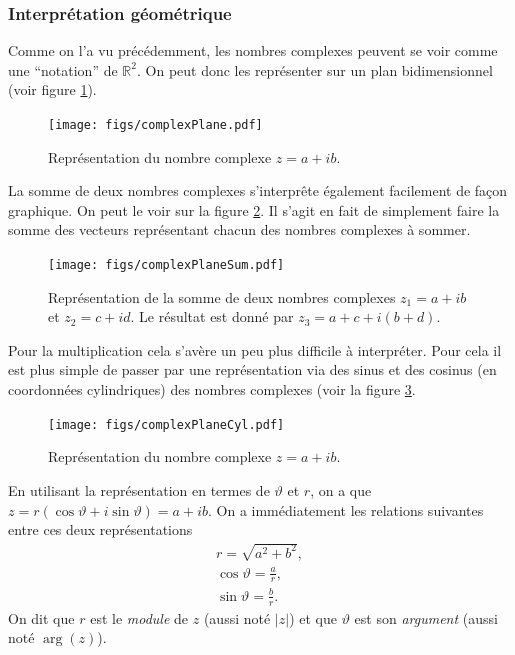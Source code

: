 \documentclass[a4paper,12pt]{book}
\newcommand{\real}{\mathbb{R}}
\begin{document}
\subsubsection{Interprétation géométrique}

Comme on l'a vu précédemment, les nombres complexes peuvent se voir comme une ``notation'' 
de $\real^2$. On peut donc les représenter sur un plan bidimensionnel (voir figure \ref{fig_complexPlane}).
\begin{figure}[htp]
\begin{center}
\texttt{[image: figs/complexPlane.pdf]}
\end{center}
\caption{Représentation du nombre complexe $z=a+ib$.}\label{fig_complexPlane}
\end{figure}
La somme de deux nombres complexes s'interprête également facilement
de façon graphique. On peut le voir sur la figure \ref{fig_complexPlaneSum}. Il s'agit en fait de simplement
faire la somme des vecteurs représentant chacun des nombres complexes à sommer.
\begin{figure}[htp]
\begin{center}
\texttt{[image: figs/complexPlaneSum.pdf]}
\end{center}
\caption{Représentation de la somme de deux nombres complexes $z_1=a+ib$ et $z_2=c+id$. Le résultat est donné par $z_3=a+c+i(b+d)$.}\label{fig_complexPlaneSum}
\end{figure}

Pour la multiplication cela s'avère un peu plus difficile à interpréter. Pour cela
il est plus simple de passer par une représentation via des sinus et des cosinus (en coordonnées cylindriques)
des nombres complexes (voir la figure \ref{fig_complexPlaneCyl}.
\begin{figure}[htp]
\begin{center}
\texttt{[image: figs/complexPlaneCyl.pdf]}
\end{center}
\caption{Représentation du nombre complexe $z=a+ib$.}\label{fig_complexPlaneCyl}
\end{figure}

En utilisant la représentation en termes de $\vartheta$ et $r$, on a que $z=r(\cos\vartheta+i\sin\vartheta)=a+ib$.
On a immédiatement les relations suivantes entre ces deux représentations
\begin{align}
 r=\sqrt{a^2+b^2},\\
 \cos\vartheta=\frac{a}{r},\\
 \sin\vartheta=\frac{b}{r}.
\end{align}
On dit que $r$ est le \textit{module} de $z$ (aussi noté $|z|$) et que $\vartheta$ est son \textit{argument} (aussi noté $\arg(z)$).
\end{document}
